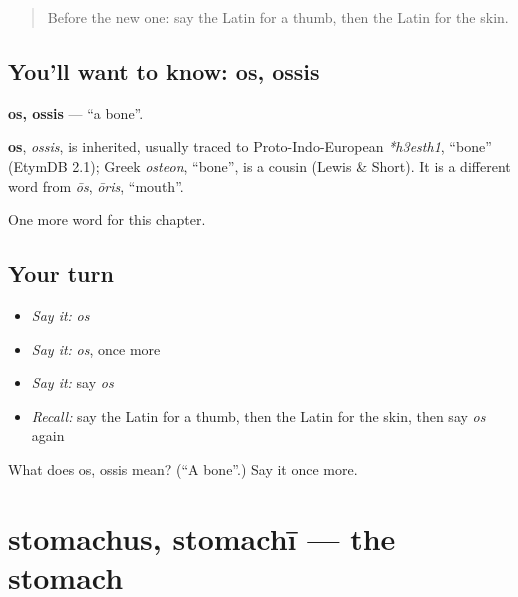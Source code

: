 \label{lesson:LA-C136-os}



\begin{quote}
Before the new one: say the Latin for a thumb, then the Latin for the skin.
\end{quote}

\subsection*{You'll want to know: os, ossis}
\textbf{os, ossis} — \textquotedblleft{}a bone\textquotedblright{}.

\begin{cousinweb}
\textbf{os}, \emph{ossis}, is inherited, usually traced to Proto-Indo-European \emph{*h3esth1}, \textquotedblleft{}bone\textquotedblright{} (EtymDB 2.1); Greek \emph{osteon}, \textquotedblleft{}bone\textquotedblright{}, is a cousin (Lewis \& Short). It is a different word from \emph{ōs}, \emph{ōris}, \textquotedblleft{}mouth\textquotedblright{}.
\end{cousinweb}

\begin{grammarlens}[title={What you've built}]
One more word for this chapter.
\end{grammarlens}

\subsection*{Your turn}
\begin{itemize}
\raggedright
  \item \emph{Say it:} \emph{os}
  \item \emph{Say it:} \emph{os}, once more
  \item \emph{Say it:} say \emph{os}
  \item \emph{Recall:} say the Latin for a thumb, then the Latin for the skin, then say \emph{os} again
\end{itemize}

\begin{tcolorbox}[breakable,colback=teal!4,colframe=teal!35!black,title={Before you move on}]
What does os, ossis mean? (\textquotedblleft{}A bone\textquotedblright{}.) Say it once more.
\end{tcolorbox}
\section[stomachus, stomachī]{stomachus, stomachī — the stomach}

